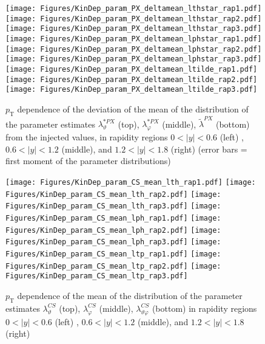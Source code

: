 \documentclass[12pt]{article}
\newcommand{\pT}{p_\mathrm{T}}
\newcommand{\absy}{\left |  y \right |}
\newcommand{\lamthCS}{\lambda^{\scriptscriptstyle CS}_\vartheta}
\newcommand{\lamphCS}{\lambda^{\scriptscriptstyle CS}_\varphi}
\newcommand{\lamthphCS}{\lambda^{\scriptscriptstyle CS}_{\vartheta \varphi}}
\newcommand{\lamtildePX}{\tilde{\lambda}^{\scriptscriptstyle PX}}
\newcommand{\lamthstarPX}{\lambda^{* \scriptscriptstyle PX}_\vartheta}
\newcommand{\lamphstarPX}{\lambda^{* \scriptscriptstyle PX}_\varphi}
\begin{document}
\begin{figure}[htbp]
\centering
\texttt{[image: Figures/KinDep\_param\_PX\_deltamean\_lthstar\_rap1.pdf]}
\texttt{[image: Figures/KinDep\_param\_PX\_deltamean\_lthstar\_rap2.pdf]}
\texttt{[image: Figures/KinDep\_param\_PX\_deltamean\_lthstar\_rap3.pdf]}
\texttt{[image: Figures/KinDep\_param\_PX\_deltamean\_lphstar\_rap1.pdf]}
\texttt{[image: Figures/KinDep\_param\_PX\_deltamean\_lphstar\_rap2.pdf]}
\texttt{[image: Figures/KinDep\_param\_PX\_deltamean\_lphstar\_rap3.pdf]}
\texttt{[image: Figures/KinDep\_param\_PX\_deltamean\_ltilde\_rap1.pdf]}
\texttt{[image: Figures/KinDep\_param\_PX\_deltamean\_ltilde\_rap2.pdf]}
\texttt{[image: Figures/KinDep\_param\_PX\_deltamean\_ltilde\_rap3.pdf]}
\caption{$\pT$ dependence of the deviation of the mean of the distribution of
the parameter estimates $\lamthstarPX$ (top), $\lamphstarPX$ (middle),
$\lamtildePX$ (bottom) from the injected values, in rapidity regions
$0<\absy<0.6$ (left) , $0.6<\absy<1.2$ (middle), and $1.2<\absy<1.8$ (right) (error bars = first moment of
the parameter distributions)}
\end{figure}
\clearpage










\begin{figure}[htbp]
\centering
\texttt{[image: Figures/KinDep\_param\_CS\_mean\_lth\_rap1.pdf]}
\texttt{[image: Figures/KinDep\_param\_CS\_mean\_lth\_rap2.pdf]}
\texttt{[image: Figures/KinDep\_param\_CS\_mean\_lth\_rap3.pdf]}
\texttt{[image: Figures/KinDep\_param\_CS\_mean\_lph\_rap1.pdf]}
\texttt{[image: Figures/KinDep\_param\_CS\_mean\_lph\_rap2.pdf]}
\texttt{[image: Figures/KinDep\_param\_CS\_mean\_lph\_rap3.pdf]}
\texttt{[image: Figures/KinDep\_param\_CS\_mean\_ltp\_rap1.pdf]}
\texttt{[image: Figures/KinDep\_param\_CS\_mean\_ltp\_rap2.pdf]}
\texttt{[image: Figures/KinDep\_param\_CS\_mean\_ltp\_rap3.pdf]}
\caption{$\pT$ dependence of the mean of the distribution of the parameter estimates $\lamthCS$ (top), $\lamphCS$ (middle), $\lamthphCS$ (bottom) in rapidity regions $0<\absy<0.6$ (left) , $0.6<\absy<1.2$ (middle), and $1.2<\absy<1.8$ (right)}
\end{figure}
\clearpage
\end{document}
